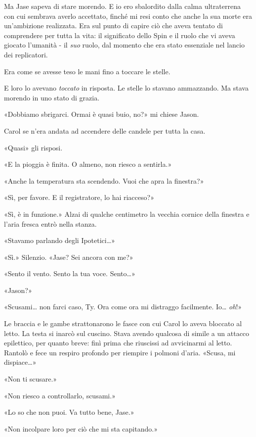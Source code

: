 Ma Jase sapeva di stare morendo. E io ero sbalordito dalla calma
ultraterrena con cui sembrava averlo accettato, finché mi resi conto che
anche la sua morte era un'ambizione realizzata. Era sul punto di capire
ciò che aveva tentato di comprendere per tutta la vita: il significato
dello Spin e il ruolo che vi aveva giocato l'umanità - il \emph{suo}
ruolo, dal momento che era stato essenziale nel lancio dei replicatori.

Era come se avesse teso le mani fino a toccare le stelle.

E loro lo avevano \emph{toccato} in risposta. Le stelle lo stavano
ammazzando. Ma stava morendo in uno stato di grazia.

\separatorefiori

«Dobbiamo sbrigarci. Ormai è quasi buio, no?» mi chiese Jason.

Carol se n'era andata ad accendere delle candele per tutta la casa.

«Quasi» gli risposi.

«E la pioggia è finita. O almeno, non riesco a sentirla.»

«Anche la temperatura sta scendendo. Vuoi che apra la finestra?»

«Sì, per favore. E il registratore, lo hai riacceso?»

«Sì, è in funzione.» Alzai di qualche centimetro la vecchia cornice
della finestra e l'aria fresca entrò nella stanza.

«Stavamo parlando degli Ipotetici\ldots»

«Sì.» Silenzio. «Jase? Sei ancora con me?»

«Sento il vento. Sento la tua voce. Sento\ldots»

«Jason?»

«Scusami\ldots{} non farci caso, Ty. Ora come ora mi distraggo
facilmente. Io\ldots{} \emph{oh}!»

Le braccia e le gambe strattonarono le fasce con cui Carol lo aveva
bloccato al letto. La testa si inarcò sul cuscino. Stava avendo qualcosa
di simile a un attacco epilettico, per quanto breve: finì prima che
riuscissi ad avvicinarmi al letto. Rantolò e fece un respiro profondo
per riempire i polmoni d'aria. «Scusa, mi dispiace\ldots»

«Non ti scusare.»

«Non riesco a controllarlo, scusami.»

«Lo so che non puoi. Va tutto bene, Jase.»

«Non incolpare loro per ciò che mi sta capitando.»

